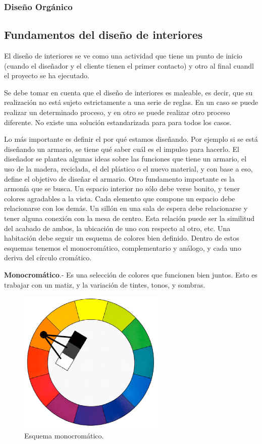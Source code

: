 \subsubsection{Diseño Orgánico}

\subsection{Fundamentos del diseño de interiores}
El diseño de interiores se ve como una actividad que tiene un punto de inicio (cuando el diseñador y el cliente tienen el primer contacto) y otro al final cuandl el proyecto se ha ejecutado.\par
Se debe tomar en cuenta que el diseño de interiores es maleable, es decir, que su realización no está sujeto estrictamente a una serie de reglas. En un caso se puede realizar un determinado proceso, y en otro se puede realizar otro proceso diferente. No existe una solución estandarizada para para todos los casos.\par
Lo más importante es definir el por qué estamos diseñando. Por ejemplo si se está diseñando un armario, se tiene qué saber cuál es el impulso para hacerlo. El diseñador se plantea algunas ideas sobre las funciones que tiene un armario, el uso de la madera, reciclada, el del plástico o el nuevo material, y con base a eso, define el objetivo de diseñar el armario.
Otro fundamento importante es la armonía que se busca. Un espacio interior no sólo debe verse bonito, y tener colores agradables a la vista. Cada elemento que compone un espacio debe relacionarse con los demás. Un sillón en una sala de espera debe relacionarse y tener alguna conexión con la mesa de centro. Esta relación puede ser la similitud del acabado de ambos, la ubicación de uno con respecto al otro, etc.
Una habitación debe seguir un esquema de colores bien definido. Dentro de estos esquemas tenemos el monocromático, complementario y análogo, y cada uno deriva del círculo cromático.\par

\textbf{Monocromático}.- Es una selección de colores que funcionen bien juntos. Esto es trabajar con un matiz, y la variación de tintes, tonos, y sombras.
\begin{figure}[h!]
	\centering
	\includegraphics[width=7cm]{imagenes/marcoteorico/disenointeriores/monocromatico.png}
	\caption{Esquema monocromático.}
	\label{fig:monocromatico}
\end{figure}

